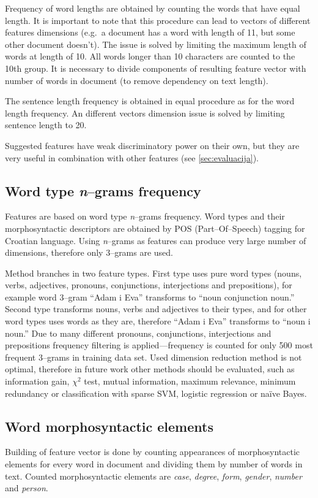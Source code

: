 \documentclass[11pt,english]{article}
\begin{document}
\begin{multicols}{2}
Frequency of word lengths are obtained by counting the words that have equal
length. It is important to note that this procedure can lead to vectors of
different features dimensions (e.g.\ a document has a word with length of 11,
but some other document doesn't). The issue is solved by limiting the maximum
length of words at length of 10. All words longer than 10 characters are
counted to the 10th group. It is necessary to divide components of resulting feature
vector with number of words in document (to remove dependency on text length).

The sentence length frequency is obtained in equal procedure as for the word
length frequency. An different vectors dimension issue is solved by limiting
sentence length to 20.

Suggested features have weak discriminatory power on their own, but they are
very useful in combination with other features (see \ref{sec:evaluacija}).

\subsection{Word type \emph{n}--grams frequency}
\label{sec:ngrami-tipova}
Features are based on word type \emph{n}--grams frequency. Word types and their
morphosyntactic descriptors are obtained by POS (Part--Of--Speech) tagging for
Croatian language. Using \emph{n}--grams as features can produce very large
number of dimensions, therefore only 3--grams are used.

Method branches in two feature types. First type uses pure word types (nouns,
verbs, adjectives, pronouns, conjunctions, interjections and prepositions), for
example word 3--gram ``Adam i Eva'' transforms to ``noun conjunction noun.''
Second type transforms nouns, verbs and adjectives to their types, and for other
word types uses words as they are, therefore ``Adam i Eva'' transforms to
``noun i noun.'' Due to many different pronouns, conjunctions, interjections and
prepositions frequency filtering is applied---frequency is counted for only 500
most frequent 3--grams in training data set. Used dimension reduction method is
not optimal, therefore in future work other methods should be evaluated, such as
information gain, $\chi^2$ test, mutual information, maximum relevance, minimum
redundancy or classification with sparse SVM, logistic regression or na\"ive
Bayes.

\subsection{Word morphosyntactic elements}
\label{sec:morphosyntactic}
Building of feature vector is done by counting appearances of morphosyntactic
elements for every word in document and dividing them by number of words in text.
Counted morphosyntactic elements are \emph{case}, \emph{degree}, \emph{form},
\emph{gender}, \emph{number} and \emph{person}.


\end{multicols}
\end{document}

